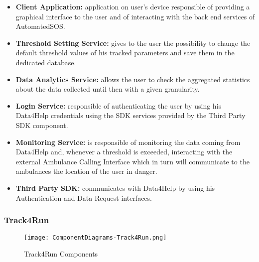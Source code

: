 \begin{itemize}
	\item \textbf{Client Application:} application on user's device responsible of providing a graphical interface to the user and of interacting with the back end  services of AutomatedSOS.
	\item \textbf{Threshold Setting Service:} gives to the user the possibility to change the default threshold values of his tracked parameters and save them in the dedicated database. 
	\item \textbf{Data Analytics Service:} allows the user to check the aggregated statistics about the data collected until then with a given granularity. 
	\item \textbf{Login Service:} responsible of authenticating the user by using his Data4Help credentials using the SDK services provided by the Third Party SDK component.
	\item \textbf{Monitoring Service:} is responsible of monitoring the data coming from Data4Help and, whenever a threshold is exceeded, interacting with the external Ambulance Calling Interface which in turn will communicate to the ambulances the location of the user in danger.
	\item \textbf{Third Party SDK:} communicates with Data4Help by using his Authentication and Data Request interfaces.
\end{itemize}


\subsubsection{Track4Run}

\FloatBarrier
\begin{figure}[!h]
	\centering
	\texttt{[image: ComponentDiagrams-Track4Run.png]}
	\caption{Track4Run Components}
\end{figure}
\FloatBarrier


